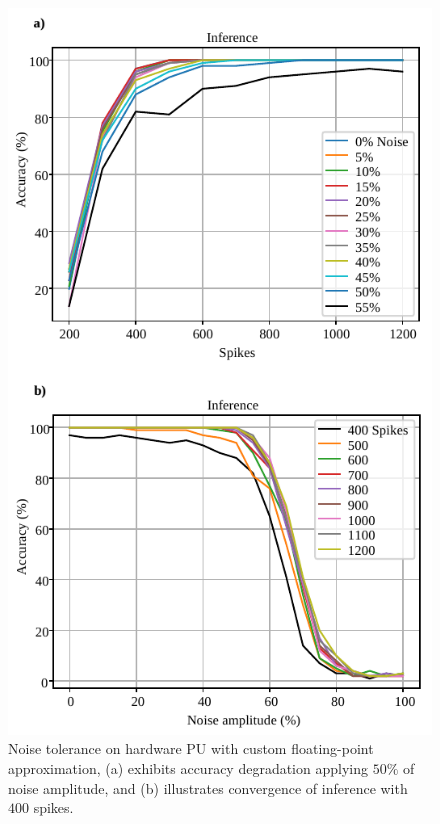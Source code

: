 \begin{figure}[t!]
	\centering
	\includegraphics[width=1\columnwidth]{../figures/accuracy_vs_noise_pu_cfp(4-bit-exponent_1-bit-mantissa).pdf}
	\caption{Noise tolerance on hardware PU with custom floating-point approximation, (a) exhibits accuracy degradation applying $50\%$ of noise amplitude, and (b) illustrates convergence of inference with $400$ spikes.}
	\label{fig:accuracy_vs_noise_pu_cfp}
\end{figure}

